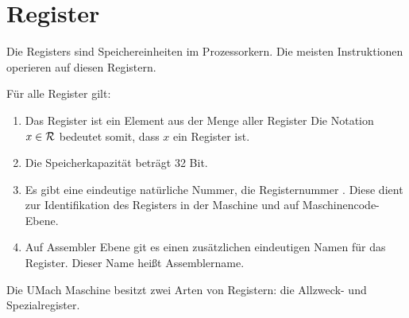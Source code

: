 \section{Register}
\label{sec:Register}

Die \glspl{Register} sind Speichereinheiten im Prozessorkern.
Die meisten Instruktionen operieren auf diesen
Registern.

Für alle Register gilt:
\begin{enumerate}
  \item Das Register ist ein Element aus der Menge \Reg aller Register
	\index{\Reg}
    Die Notation $x \in \mathcal{R}$ bedeutet somit, dass $x$ ein Register ist.
  \item Die Speicherkapazität beträgt 32 Bit.
  \item Es gibt eine eindeutige natürliche Nummer, die \gls{Registernummer}
    . Diese dient zur
    Identifikation des Registers in der Maschine und auf Maschinencode-Ebene.
  \item Auf Assembler Ebene git es einen zusätzlichen eindeutigen Namen für das
    Register. Dieser Name heißt
    \gls{Assemblername}.
\end{enumerate}

Die UMach Maschine besitzt zwei Arten von Registern: die Allzweck- und
Spezialregister.





